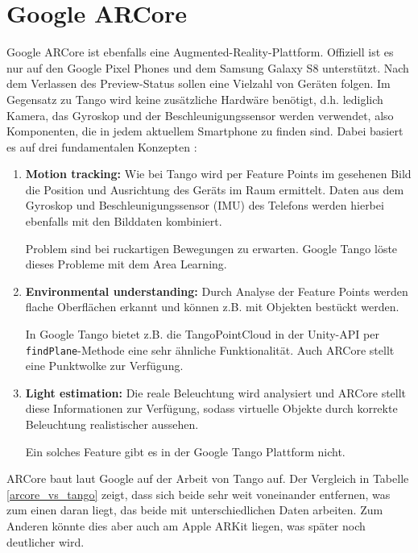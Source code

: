 
\section{Google ARCore}
Google ARCore ist ebenfalls eine Augmented-Reality-Plattform. Offiziell ist es nur auf den Google Pixel Phones und dem Samsung Galaxy S8 unterstützt. Nach dem Verlassen des Preview-Status sollen eine Vielzahl von Geräten folgen. Im Gegensatz zu Tango wird keine zusätzliche Hardwäre benötigt, d.h. lediglich Kamera, das Gyroskop und der Beschleunigungssensor werden verwendet, also Komponenten, die in jedem aktuellem Smartphone zu finden sind. Dabei basiert es auf drei fundamentalen Konzepten \cite{arcore_overview}:
\begin{enumerate}
	\item \textbf{Motion tracking:} Wie bei Tango wird per Feature Points im gesehenen Bild die Position und Ausrichtung des Geräts im Raum ermittelt. Daten aus dem Gyroskop und Beschleunigungssensor (IMU) des Telefons werden hierbei ebenfalls mit den Bilddaten kombiniert. \cite{arcore_fundamentals}
	
	Problem sind bei ruckartigen Bewegungen zu erwarten. Google Tango löste dieses Probleme mit dem Area Learning.
	\item \textbf{Environmental understanding:}  Durch Analyse der Feature Points werden flache Oberflächen erkannt und können z.B. mit Objekten bestückt werden. \cite{arcore_fundamentals}
	
	In Google Tango bietet z.B. die TangoPointCloud in der Unity-API per \texttt{findPlane}-Methode eine sehr ähnliche Funktionalität. Auch ARCore stellt eine Punktwolke zur Verfügung.
	\item \textbf{Light estimation:} Die reale Beleuchtung wird analysiert und ARCore stellt diese Informationen zur Verfügung, sodass virtuelle Objekte durch korrekte Beleuchtung realistischer aussehen. \cite{arcore_fundamentals}
	
	Ein solches Feature gibt es in der Google Tango Plattform nicht.
\end{enumerate}

ARCore baut laut Google auf der Arbeit von Tango auf. Der Vergleich in Tabelle \ref{arcore_vs_tango} zeigt, dass sich beide sehr weit voneinander entfernen, was zum einen daran liegt, das beide mit unterschiedlichen Daten arbeiten. Zum Anderen könnte dies aber auch am Apple ARKit liegen, was später noch deutlicher wird.

